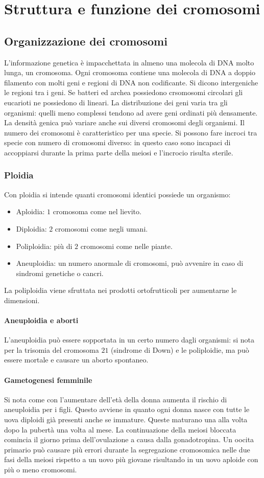 \chapter{Struttura e funzione dei cromosomi}
\section{Organizzazione dei cromosomi}
L'informazione genetica \`e impacchettata in almeno una molecola di DNA molto lunga, un cromosoma. Ogni cromosoma contiene una molecola di DNA a doppio filamento con molti geni e regioni
di DNA non codificante. Si dicono intergeniche le regioni tra i geni. Se batteri ed archea possiedono crsomosomi circolari gli eucarioti ne possiedono di lineari. La distribuzione dei
geni varia tra gli organismi: quelli meno complessi tendono ad avere geni ordinati pi\`u densamente. La densit\`a genica pu\`o variare anche sui diversi cromosomi degli organismi. Il
numero dei cromosomi \`e caratteristico per una specie. Si possono fare incroci tra specie con numero di cromosomi diverso: in questo caso sono incapaci di accoppiarsi durante la prima 
parte della meiosi e l'incrocio risulta sterile.
\subsection{Ploidia}
Con ploidia si intende quanti cromosomi identici possiede un organismo:
\begin{itemize}
	\item Aploidia: $1$ cromosoma come nel lievito.
	\item Diploidia: $2$ cromosomi come negli umani.
	\item Poliploidia: pi\`u di $2$ cromosomi come nelle piante.
	\item Aneuploidia: un numero anormale di cromosomi, pu\`o avvenire in caso di sindromi genetiche o cancri.
\end{itemize}
La poliploidia viene sfruttata nei prodotti ortofrutticoli per aumentarne le dimensioni.
\subsubsection{Aneuploidia e aborti}
L'aneuploidia pu\`o essere sopportata in un certo numero dagli organismi: si nota per la trisomia del cromosoma $21$ (sindrome di Down) e le poliploidie, ma pu\`o essere mortale e
causare un aborto spontaneo.
\subsubsection{Gametogenesi femminile}
Si nota come con l'aumentare dell'et\`a della donna aumenta il rischio di aneuploidia per i figli. Questo avviene in quanto ogni donna nasce con tutte le uova diploidi gi\`a presenti 
anche se immature. Queste maturano una alla volta dopo la pubert\`a una volta al mese. La continuazione della meiosi bloccata comincia il giorno prima dell'ovulazione a causa dalla
gonadotropina. Un oocita primario pu\`o causare pi\`u errori durante la segregazione cromosomica nelle due fasi della meiosi rispetto a un uovo pi\`u giovane risultando in un uovo 
aploide con pi\`u o meno cromosomi. 
